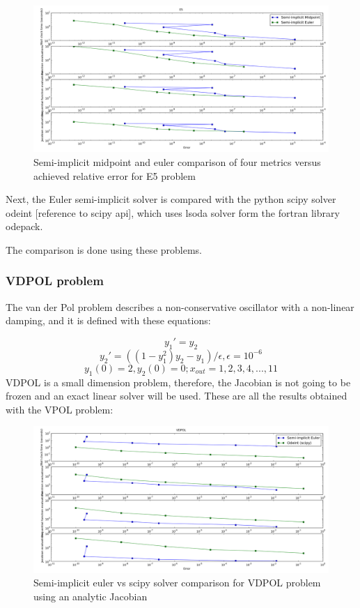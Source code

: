 \documentclass[12pt]{article}
\begin{document}
\begin{figure}[h]
 \includegraphics[scale=0.3]{implicit_images/E5_midpoin_euler_g.png}
\centering
\caption{Semi-implicit midpoint and euler comparison of four metrics versus achieved relative error for E5 problem}
\end{figure}

Next, the Euler semi-implicit solver is compared with the python scipy solver odeint [reference to scipy api], which uses lsoda solver form the fortran library odepack.

The comparison is done using these problems.

\subsubsection{VDPOL problem}
The van der Pol problem describes a non-conservative oscillator with a non-linear damping, and it is defined with these equations:

$$y_{1}' = y_{2}$$
$$y_{2}' = ((1-y_{1}^{2})y_{2}-y_{1})/\epsilon, \epsilon=10^{-6}$$
$$y_{1}(0)=2, y_{2}(0)=0; x_{out}=1,2,3,4,...,11$$
VDPOL is a small dimension problem, therefore, the Jacobian is not going to be frozen and an exact linear solver will be used. These are all the results obtained with the VPOL problem:

\begin{figure}[h]
 \includegraphics[scale=0.3]{implicit_images/VDPOL_g.png}
\centering
\caption{Semi-implicit euler vs scipy solver comparison for VDPOL problem using an analytic Jacobian}
\end{figure}
\end{document}
